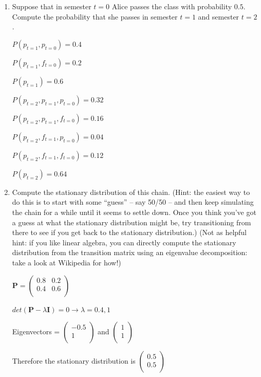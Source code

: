\documentclass[fleqn]{hermans-hw}
\newcommand{\BP}{\mathbf{P}}
\begin{document}
\begin{enumerate}
\item Suppose that in semester $t=0$ Alice passes the class with
  probability $0.5$.  Compute the probability that she passes in
  semester $t=1$ and semester $t=2$.
  
	$P(p_{t=1}, p_{t=0}) = 0.4$
  
	$P(p_{t=1}, f_{t=0}) = 0.2$
	
	$P(p_{t=1}) = 0.6$
	
	\bigskip
  
	$P(p_{t=2}, p_{t=1}, p_{t=0}) = 0.32$

	$P(p_{t=2}, p_{t=1}, f_{t=0}) = 0.16$
	
	$P(p_{t=2}, f_{t=1}, p_{t=0}) = 0.04$
	
	$P(p_{t=2}, f_{t=1}, f_{t=0}) = 0.12$
	
	$P(p_{t=2}) = 0.64$
	
\item Compute the stationary distribution of this chain.  (Hint: the
  easiest way to do this is to start with some ``guess'' -- say 50/50
  -- and then keep simulating the chain for a while until it seems to
  settle down.  Once you think you've got a guess at what the
  stationary distribution might be, try transitioning from there to
  see if you get back to the stationary distribution.)  (Not as
  helpful hint: if you like linear algebra, you can directly compute
  the stationary distribution from the transition matrix using an
  eigenvalue decomposition: take a look at Wikipedia for how!)
  
	$\BP = 
	\begin{pmatrix}
	0.8 & 0.2 \\
	0.4 & 0.6 \\
	\end{pmatrix}$
	
	$det(\BP - \lambda\mathbf{I}) = 0 \rightarrow \lambda = 0.4, 1$
	
	Eigenvectors = $\begin{pmatrix} -0.5 \\ 1 \\ \end{pmatrix}$ and $\begin{pmatrix} 1 \\ 1 \\ \end{pmatrix}$
	
	Therefore the stationary distribution is $\begin{pmatrix} 0.5 \\ 0.5 \\ \end{pmatrix}$
  
\end{enumerate}
\vspace{-0.5cm}
\end{document}
